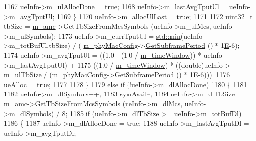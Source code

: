 \begin{DoxyCode}
1167                                         ueInfo->m\_ulAllocDone = \textcolor{keyword}{true};
1168                                         ueInfo->m\_lastAvgTputUl = ueInfo->m\_avgTputUl;
1169                                 \}
1170                                 ueInfo->m\_allocUlLast = \textcolor{keyword}{true};
1171 
1172                                 uint32\_t tbSize = \hyperlink{classns3_1_1MmWaveFlexTtiPfMacScheduler_ab9cf29146f4e3094526de08ffe08b193}{m\_amc}->GetTbSizeFromMcsSymbols (ueInfo->m\_ulMcs, 
      ueInfo->m\_ulSymbols);
1173                                 ueInfo->m\_currTputUl = \hyperlink{80211b_8c_ac6afabdc09a49a433ee19d8a9486056d}{std::min}(ueInfo->m\_totBufUl,tbSize) / (
      \hyperlink{classns3_1_1MmWaveMacScheduler_a24d7af4971d2e500fe543cefbafa2fd9}{m\_phyMacConfig}->\hyperlink{classns3_1_1MmWavePhyMacCommon_a1d402260d29c8931dd3dde73b295e23d}{GetSubframePeriod} () * 1\hyperlink{packet-test-suite_8cc_a171669980e29849aa5e3722d573181ee}{E}-6);
1174                                 ueInfo->m\_avgTputUl = ((1.0 - (1.0 / 
      \hyperlink{classns3_1_1MmWaveFlexTtiPfMacScheduler_adc8b66b1890b4ba9d14f1d294af36b07}{m\_timeWindow})) * ueInfo->m\_lastAvgTputUl) +
1175                                                 ((1.0 / \hyperlink{classns3_1_1MmWaveFlexTtiPfMacScheduler_adc8b66b1890b4ba9d14f1d294af36b07}{m\_timeWindow}) * ((double)ueInfo->
      m\_ulTbSize / (\hyperlink{classns3_1_1MmWaveMacScheduler_a24d7af4971d2e500fe543cefbafa2fd9}{m\_phyMacConfig}->\hyperlink{classns3_1_1MmWavePhyMacCommon_a1d402260d29c8931dd3dde73b295e23d}{GetSubframePeriod} () * 1\hyperlink{packet-test-suite_8cc_a171669980e29849aa5e3722d573181ee}{E}-6)));
1176                                 ueAlloc = \textcolor{keyword}{true};
1177 
1178                         \}
1179                         \textcolor{keywordflow}{else} \textcolor{keywordflow}{if} (!ueInfo->m\_dlAllocDone)
1180                         \{
1181 
1182                                 ueInfo->m\_dlSymbols++;
1183                                 symAvail--;
1184                                 ueInfo->m\_dlTbSize = \hyperlink{classns3_1_1MmWaveFlexTtiPfMacScheduler_ab9cf29146f4e3094526de08ffe08b193}{m\_amc}->GetTbSizeFromMcsSymbols (ueInfo->m\_dlMcs, 
      ueInfo->m\_dlSymbols) / 8;
1185                                 \textcolor{keywordflow}{if} (ueInfo->m\_dlTbSize >= ueInfo->m\_totBufDl)
1186                                 \{
1187                                         ueInfo->m\_dlAllocDone = \textcolor{keyword}{true};
1188                                         ueInfo->m\_lastAvgTputDl = ueInfo->m\_avgTputDl;

\end{DoxyCode}
